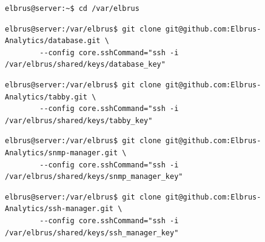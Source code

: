 \documentclass{article}
\begin{document}
	\lstset{style=commands}
	\begin{lstlisting}[caption={Wechseln des Verzeichnisses.}]
		elbrus@server:~$ cd /var/elbrus
	\end{lstlisting}
	
	\lstset{style=commands}
	\begin{lstlisting}[caption={Clonen der Datenbank Software.}]
		elbrus@server:/var/elbrus$ git clone git@github.com:Elbrus-Analytics/database.git \
		--config core.sshCommand="ssh -i /var/elbrus/shared/keys/database_key"
	\end{lstlisting}
	

	
	\lstset{style=commands}
	\begin{lstlisting}[caption={Clonen der Kernsoftware 'tabby'.}]
		elbrus@server:/var/elbrus$ git clone git@github.com:Elbrus-Analytics/tabby.git \
		--config core.sshCommand="ssh -i /var/elbrus/shared/keys/tabby_key"
	\end{lstlisting}
	
	\lstset{style=commands}
	\begin{lstlisting}[caption={Clonen der 'SNMP-Manager' Software.}]
		elbrus@server:/var/elbrus$ git clone git@github.com:Elbrus-Analytics/snmp-manager.git \
		--config core.sshCommand="ssh -i /var/elbrus/shared/keys/snmp_manager_key"
	\end{lstlisting}

	\lstset{style=commands}
	\begin{lstlisting}[caption={Clonen der 'SSH-Manager' Software.}]
		elbrus@server:/var/elbrus$ git clone git@github.com:Elbrus-Analytics/ssh-manager.git \
		--config core.sshCommand="ssh -i /var/elbrus/shared/keys/ssh_manager_key"
	\end{lstlisting}
	
\end{document}
